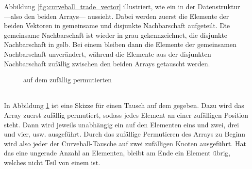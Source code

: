 Abbildung \ref{fig:curveball_trade_vector} illustriert, wie ein \ct{} 
in der Datenstruktur ---also den beiden Arrays--- aussieht. Dabei werden zuerst die Elemente
der beiden Vektoren in gemeinsame und disjunkte Nachbarschaft aufgeteilt. Die gemeinsame Nachbarschaft ist
wieder in grau gekennzeichnet, die disjunkte Nachbarschaft in gelb. 
Bei einem \ct{} bleiben dann die Elemente 
der gemeinsamen Nachbarschaft unverändert, während die Elemente aus der 
disjunkten Nachbarschaft zufällig zwischen den beiden 
Arrays getauscht werden.
%
%
% 
\begin{figure}
\centering
  \caption{\gc{} auf dem zufällig permutierten \partvek}
  \label{fig:global_curveball_trade_vector}
  
\end{figure}
%
%
%
\\

In Abbildung \ref{fig:global_curveball_trade_vector} ist eine Skizze für einen \gc{} Tausch
auf dem \partvek{} gegeben.
Dazu wird das Array zuerst zufällig permutiert, sodass jedes Element an einer zufälligen
Position steht.
Dann wird jeweils unabhängig ein \ct{} auf den Elementen eins und zwei, drei und vier, usw. ausgeführt.
Durch das zufällige Permutieren des Arrays zu Beginn wird also jeder der Curveball-Tausche auf zwei zufälligen
Knoten ausgeführt. Hat das \partvek{} eine ungerade Anzahl an Elementen, bleibt am Ende ein Element übrig, 
welches nicht Teil von einem \ct{} ist. 






